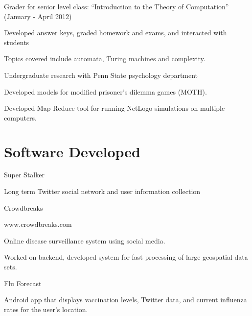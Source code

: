 \documentclass[margin,line]{res}
\newcommand{\linkToUrl}[1]{{\color{blue}\underline{\href{#1}{Link}}}}
\renewcommand{\linkToUrl}[1]{}
\newenvironment{list1}{
  \begin{list}{\ding{113}}{%
      \setlength{\itemsep}{0in}
      \setlength{\parsep}{0in} \setlength{\parskip}{0in}
      \setlength{\topsep}{0in} \setlength{\partopsep}{0in} 
      \setlength{\leftmargin}{0.17in}}}{\end{list}}
\begin{document}
\begin{resume}
Grader for senior level class: ``Introduction to the Theory of Computation'' (January - April 2012)
\begin{list1}
\item[] Developed answer keys, graded homework and exams, and interacted with students
\item[] Topics covered include automata, Turing machines and complexity.
\end{list1}
Undergraduate research with Penn State psychology department%
\begin{list1}
\item[] Developed models for modified prisoner's dilemma games (MOTH).
\item[] Developed Map-Reduce tool for running NetLogo simulations on multiple computers. \linkToUrl{http://bit.ly/12UQ4cq}
\end{list1}




\section{\sc Software Developed}
Super Stalker
\begin{list1}
\item[] Long term Twitter social network and user information collection
\end{list1}

Crowdbreaks \linkToUrl{http://www.crowdbreaks.com}
\begin{list1}
\item[] www.crowdbreaks.com
\item[] Online disease surveillance system using social media.
\item[] Worked on backend, developed system for fast processing of large geospatial data sets.
\end{list1}

Flu Forecast
\begin{list1}
\item[] Android app that displays vaccination levels, Twitter data, and current influenza rates for the user's location.
\end{list1}


\end{resume}
\end{document}
